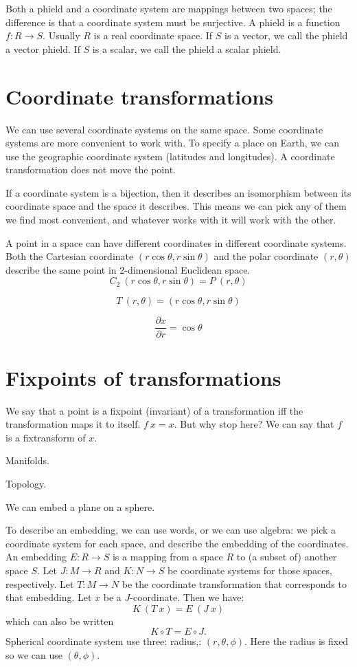 Both a phield and a coordinate system are mappings between two spaces;
the difference is that a coordinate system must be surjective.
A phield is a function $f : R \to S$.
Usually $R$ is a real coordinate space.
If $S$ is a vector, we call the phield a vector phield.
If $S$ is a scalar, we call the phield a scalar phield.

\section{Coordinate transformations}

We can use several coordinate systems on the same space.
Some coordinate systems are more convenient to work with.
To specify a place on Earth, we can use the
geographic coordinate system (latitudes and longitudes).
A coordinate transformation does not move the point.

If a coordinate system is a bijection,
then it describes an isomorphism between
its coordinate space and the space it describes.
This means we can pick any of them we find most convenient,
and whatever works with it will work with the other.

A point in a space can have different coordinates in different coordinate systems.
Both the Cartesian coordinate $(r\cos\theta, r\sin\theta)$ and the polar coordinate $(r,\theta)$
describe the same point in 2-dimensional Euclidean space.
\[
C_2~(r\cos\theta, r\sin\theta) = P~(r,\theta)
\]

\[
T~(r,\theta) = (r \cos \theta, r \sin \theta)
\]

\[
\frac{\partial x}{\partial r} = \cos \theta
\]

\section{Fixpoints of transformations}

We say that a point is a fixpoint (invariant)
of a transformation iff the transformation maps it to itself.
$f~x = x$.
But why stop here?
We can say that $f$ is a fixtransform of $x$.

Manifolds.

Topology.

We can embed a plane on a sphere.

To describe an embedding,
we can use words, or we can use algebra:
we pick a coordinate system for each space,
and describe the embedding of the coordinates.
An embedding $E : R \to S$ is a mapping from a space $R$ to (a subset of) another space $S$.
Let $J : M \to R$ and $K : N \to S$ be coordinate systems for those spaces, respectively.
Let $T : M \to N$ be the coordinate transformation that corresponds to that embedding.
Let $x$ be a $J$-coordinate.
Then we have:
\[
K~(T~x) = E~(J~x)
\]
which can also be written
\[
K \circ T = E \circ J.
\]
Spherical coordinate system
use three: radius,: $(r,\theta,\phi)$. Here the radius is fixed so we can use $(\theta,\phi)$.

